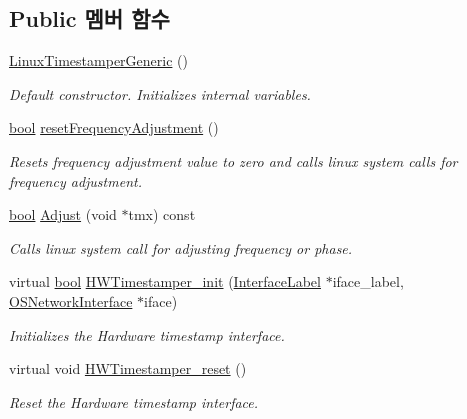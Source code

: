 \subsection*{Public 멤버 함수}
\begin{DoxyCompactItemize}
\item 
\hyperlink{class_linux_timestamper_generic_acfc48b4379f1b8fd4c1c30e06190aaff}{Linux\+Timestamper\+Generic} ()
\begin{DoxyCompactList}\small\item\em Default constructor. Initializes internal variables. \end{DoxyCompactList}\item 
\hyperlink{avb__gptp_8h_af6a258d8f3ee5206d682d799316314b1}{bool} \hyperlink{class_linux_timestamper_generic_a0db03755529ffca07f6d4a46d26a60c8}{reset\+Frequency\+Adjustment} ()
\begin{DoxyCompactList}\small\item\em Resets frequency adjustment value to zero and calls linux system calls for frequency adjustment. \end{DoxyCompactList}\item 
\hyperlink{avb__gptp_8h_af6a258d8f3ee5206d682d799316314b1}{bool} \hyperlink{class_linux_timestamper_generic_a1d52a5a84b74222b880522cee01475e1}{Adjust} (void $\ast$tmx) const 
\begin{DoxyCompactList}\small\item\em Calls linux system call for adjusting frequency or phase. \end{DoxyCompactList}\item 
virtual \hyperlink{avb__gptp_8h_af6a258d8f3ee5206d682d799316314b1}{bool} \hyperlink{class_linux_timestamper_generic_a7a098484ed16d09074217e92eb22d03d}{H\+W\+Timestamper\+\_\+init} (\hyperlink{class_interface_label}{Interface\+Label} $\ast$iface\+\_\+label, \hyperlink{class_o_s_network_interface}{O\+S\+Network\+Interface} $\ast$iface)
\begin{DoxyCompactList}\small\item\em Initializes the Hardware timestamp interface. \end{DoxyCompactList}\item 
virtual void \hyperlink{class_linux_timestamper_generic_a4ad3a40de8c6141b2d26b9df5cc3cd97}{H\+W\+Timestamper\+\_\+reset} ()
\begin{DoxyCompactList}\small\item\em Reset the Hardware timestamp interface. \end{DoxyCompactList}\item 

\end{DoxyCompactItemize}

